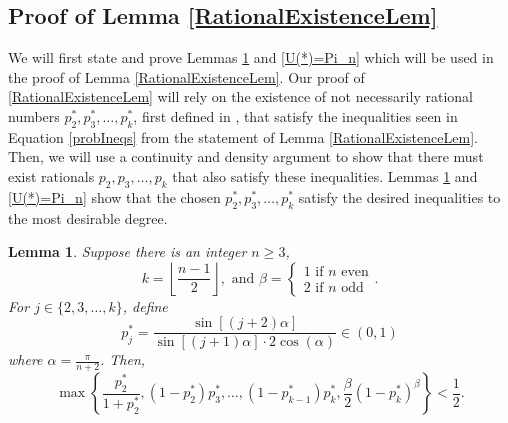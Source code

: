 \documentclass[11pt]{article}
\newtheorem{lemma}[theorem]{Lemma}
\theoremstyle{definition}
\begin{document}
\subsection{Proof of Lemma \ref{RationalExistenceLem}}
We will first state and prove Lemmas \ref{L(*)<1/2} and \ref{U(*)=Pi_n} which will be used in the proof of Lemma \ref{RationalExistenceLem}. Our proof of \ref{RationalExistenceLem} will rely on the existence of not necessarily rational numbers $p_2^*,p_3^*,\dots,p_k^*$, first defined in \cite{Komisarski2021}, that satisfy the inequalities seen in Equation \ref{probIneqs} from the statement of Lemma \ref{RationalExistenceLem}. Then, we will use a continuity and density argument to show that there must exist rationals $p_2,p_3,\dots,p_k$ that also satisfy these inequalities. Lemmas \ref{L(*)<1/2} and \ref{U(*)=Pi_n} show that the chosen $p_2^*,p_3^*,\dots,p_k^*$ satisfy the desired inequalities to the most desirable degree.
\begin{lemma}\label{L(*)<1/2}
    Suppose there is an integer $n \geq 3$,
    $$k = \left\lfloor \frac{n-1}{2} \right\rfloor, \text{ and } \beta = \begin{cases} 1 \text{ if } n \text{ even} \\ 2 \text{ if } n \text{ odd} \end{cases}.$$
    For $j\in \{2,3,\dots,k \}$, define
    $$p_j^* = \frac{\sin[(j+2)\alpha]}{\sin[(j+1)\alpha]\cdot 2 \cos(\alpha)} \in (0,1)$$
    where $\alpha= \frac{\pi}{n+2}$. Then,
    $$\max \left\{ \frac{p_2^*}{1+p_2^*}, (1-p_2^*)p_3^*, \dots, (1-p_{k-1}^*)p_{k}^*, \frac{\beta}{2}(1-p_k^*)^\beta \right\} < \frac{1}{2}.$$
\end{lemma}
\end{document}
